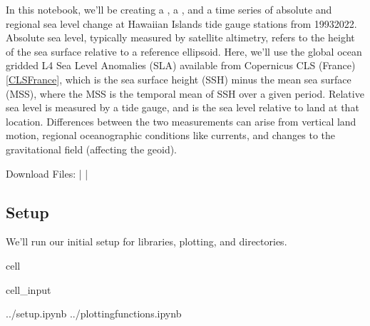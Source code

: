 \documentclass[letterpaper,10pt,english]{jupyterBook}
\begin{document}
\sphinxAtStartPar
In this notebook, we’ll be creating a {\hyperref[\detokenize{notebooks/regional_and_local/SL_Trend:create-a-table}]{}}, a {\hyperref[\detokenize{notebooks/regional_and_local/SL_Trend:fig-mag}]{}}, and a time series {\hyperref[\detokenize{notebooks/regional_and_local/SL_Trend:trend-fig}]{}} of absolute and regional sea level change at Hawaiian Islands tide gauge stations from 1993\sphinxhyphen{}2022. Absolute sea level, typically measured by satellite altimetry, refers to the height of the sea surface relative to a reference ellipsoid. Here, we’ll use the global ocean gridded L4 Sea Level Anomalies (SLA) available from Copernicus CLS (France) {[}\hyperlink{cite.notebooks/regional_and_local/SL_Trend:id10}{CLSFrance}{]}, which is the sea surface height (SSH) minus the mean sea surface (MSS), where the MSS is the temporal mean of SSH over a given period. Relative sea level is measured by a tide gauge, and is the sea level relative to land at that location. Differences between the two measurements can arise from vertical land motion, regional oceanographic conditions like currents, and changes to the gravitational field (affecting the geoid).

\sphinxAtStartPar
Download Files:
 |
 |


\subsection{Setup}
\label{\detokenize{notebooks/regional_and_local/SL_Trend:setup}}
\sphinxAtStartPar
We’ll run our initial setup for libraries, plotting, and directories.

\begin{sphinxuseclass}{cell}\begin{sphinxVerbatimInput}

\begin{sphinxuseclass}{cell_input}
\begin{sphinxVerbatim}[commandchars=\\\{\}]
 ../setup.ipynb  
 ../plotting\PYGZus{}functions.ipynb
   
   
\end{sphinxVerbatim}

\end{sphinxuseclass}\end{sphinxVerbatimInput}

\end{sphinxuseclass}
\end{document}
